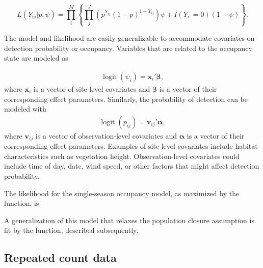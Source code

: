\documentclass[article,shortnames]{jss}
\DeclareMathOperator{\logit}{logit}
\begin{document}
\begin{equation}
L(Y_{ij}| p,\psi) = 
 \prod_{i}^{M} \left\{
    \prod_{j}^{J} 
      \left(p^{Y_{ij}}(1-p)^{1-Y_{ij}}\right)
          \psi + I(Y_{i.}=0)(1-\psi) \right\}. 
\end{equation}

The model and likelihood are easily generalizable to accommodate covariates on 
detection probability or occupancy.
Variables that are related to the occupancy state are modeled as

\begin{gather}
  \logit(\psi_i) = \mathbf x_i' \mathbf \beta,
\end{gather}
where $\mathbf x_i$ is a vector of site-level covariates and $\mathbf \beta$
is a vector of their corresponding effect parameters.  Similarly, the
probability of detection can be modeled with
\begin{gather}
  \logit(p_{ij}) = \mathbf v_{ij}' \mathbf \alpha,
\end{gather}
where $\mathbf v_{ij}$ is a vector of observation-level covariates and
$\mathbf \alpha$ is a vector of their corresponding effect parameters.  
Examples of site-level covariates include habitat characteristics such as 
vegetation height. Observation-level covariates could include time of day, 
date, wind speed, or other factors that might affect detection probability. 

The likelihood for the single-season occupancy model, as maximized by the
 function, is


A generalization of this model that relaxes the population closure
assumption is fit by the  function, described subsequently.

\subsection{Repeated count data}
\label{sec:repeated-count-data}
\end{document}
